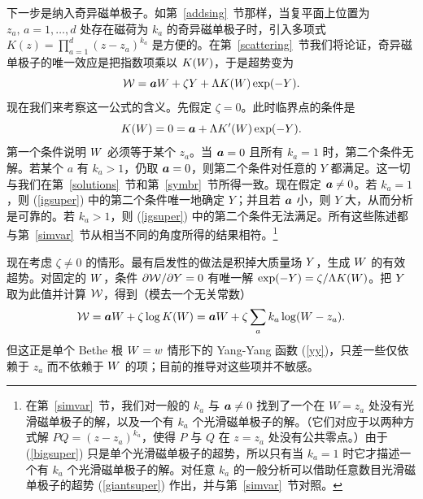 下一步是纳入奇异磁单极子。如第~\ref{addsing}~节那样，当复平面上位置为 $z_a,\,a=1,\dots,d$ 处存在磁荷为 $k_a$ 的奇异磁单极子时，引入多项式 $K(z)=\prod_{a=1}^d(z-z_a)^{k_a}$ 是方便的。在第~\ref{scattering}~节我们将论证，奇异磁单极子的唯一效应是把指数项乘以 $K({ W})$，于是超势变为
\begin{equation}\label{bigsuper}{\mathcal W}={\boldsymbol{a}} { W}+\zeta{ Y} +\Lambda K({ W})\exp(-{ Y}).\end{equation}
现在我们来考察这一公式的含义。先假定 $\zeta=0$。此时临界点的条件是
\begin{equation}\label{igsuper}K({ W})=0={\boldsymbol{a}}+\Lambda K'({ W})\exp(-{ Y}).\end{equation}
第一个条件说明 ${ W}$ 必须等于某个 $z_a$。当 ${\boldsymbol{a}}=0$ 且所有 $k_a=1$ 时，第二个条件无解。若某个 $a$ 有 $k_a>1$，仍取 ${\boldsymbol{a}}=0$，则第二个条件对任意的 $Y$ 都满足。这一切与我们在第~\ref{solutions}~节和第~\ref{symbr}~节所得一致。现在假定 ${\boldsymbol{a}}\not=0$。若 $k_a=1$，则 (\ref{igsuper}) 中的第二个条件唯一地确定 $Y$；并且若 ${\boldsymbol{a}}$ 小，则 $Y$ 大，从而分析是可靠的。若 $k_a>1$，则 (\ref{igsuper}) 中的第二个条件无法满足。所有这些陈述都与第~\ref{simvar}~节从相当不同的角度所得的结果相符。\footnote{在第~\ref{simvar}~节，我们对一般的 $k_a$ 与 ${\boldsymbol{a}}\not=0$ 找到了一个在 $W=z_a$ 处没有光滑磁单极子的解，以及一个有 $k_a$ 个光滑磁单极子的解。（它们对应于以两种方式解 $PQ=(z-z_a)^{k_a}$，使得 $P$ 与 $Q$ 在 $z=z_a$ 处没有公共零点。）由于 (\ref{bigsuper}) 只是单个光滑磁单极子的超势，所以只有当 $k_a=1$ 时它才描述一个有 $k_a$ 个光滑磁单极子的解。对任意 $k_a$ 的一般分析可以借助任意数目光滑磁单极子的超势 (\ref{giantsuper}) 作出，并与第~\ref{simvar}~节对照。}


现在考虑 $\zeta\not=0$ 的情形。最有启发性的做法是积掉大质量场 ${ Y}$，生成 ${ W}$ 的有效超势。对固定的 ${ W}$，条件 $\partial{\mathcal W}/\partial { Y}=0$ 有唯一解 $\exp(-{ Y})=\zeta/\Lambda K({ W})$。把 ${ Y}$ 取为此值并计算 ${\mathcal W}$，得到（模去一个无关常数）
\begin{equation}\label{twig} {\mathcal W}={\boldsymbol{a}} { W} + \zeta\log K({ W})={\boldsymbol{a}}{ W}+\zeta\sum_a k_a
\log({ W}-z_a).  \end{equation}
但这正是单个 Bethe 根 ${ W}=w$ 情形下的 Yang-Yang 函数 (\ref{yy})，只差一些仅依赖于 $z_a$ 而不依赖于 ${ W}$ 的项；目前的推导对这些项并不敏感。


